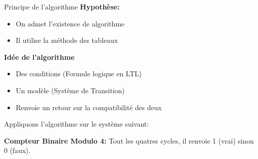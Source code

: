 \documentclass{beamer}
\begin{document}
\begin{frame}{Principe de l'algorithme}
    \textbf{Hypothèse:}
    \begin{itemize}
        \item On admet l'existence de algorithme
        \item Il utilise la méthode des tableaux
    \end{itemize}
    \pause
    \vspace{10px}
    \textbf{Idée de l'algorithme}
    \begin{itemize}
        \item Des conditions (Formule logique en LTL)
        \item Un modèle (Système de Transition)
        \item Renvoie un retour sur la compatibilité des deux
    \end{itemize}
    \vspace{10px}
    Appliquons l'algorithme sur le système suivant:
    
    \textbf{Compteur Binaire Modulo 4: } Tout les quatres cycles, il renvoie 1 (vrai) sinon 0 (faux).
\end{frame}
\end{document}
